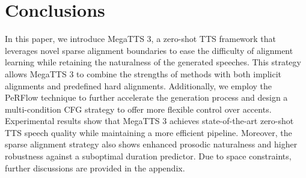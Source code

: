 \section{Conclusions}
In this paper, we introduce MegaTTS 3, a zero-shot TTS framework that leverages novel sparse alignment boundaries to ease the difficulty of alignment learning while retaining the naturalness of the generated speeches. This strategy allows MegaTTS 3 to combine the strengths of methods with both implicit alignments and predefined hard alignments. Additionally, we employ the PeRFlow technique to further accelerate the generation process and design a multi-condition CFG strategy to offer more flexible control over accents. Experimental results show that MegaTTS 3 achieves state-of-the-art zero-shot TTS speech quality while maintaining a more efficient pipeline. Moreover, the sparse alignment strategy also shows enhanced prosodic naturalness and higher robustness against a suboptimal duration predictor. Due to space constraints, further discussions are provided in the appendix.

